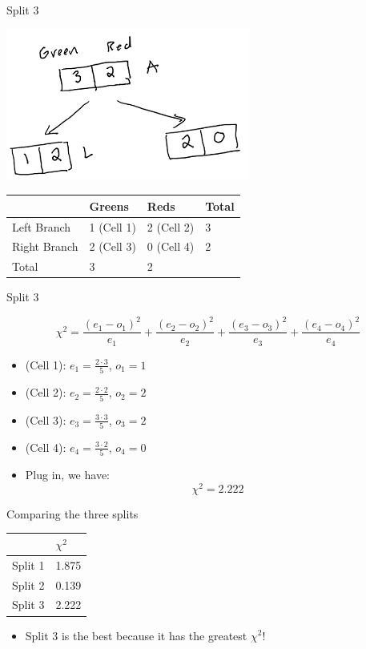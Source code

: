 \documentclass[
  ignorenonframetext,
]{beamer}
\providecommand{\tightlist}{%
  \setlength{\itemsep}{0pt}\setlength{\parskip}{0pt}}
\begin{document}
\begin{frame}{Split 3}
\protect\hypertarget{split-3}{}

\includegraphics{images2/im2.png}

\begin{longtable}[]{@{}llll@{}}
\toprule
& Greens & Reds & Total\tabularnewline
\midrule
\endhead
Left Branch & 1 (Cell 1) & 2 (Cell 2) & 3\tabularnewline
Right Branch & 2 (Cell 3) & 0 (Cell 4) & 2\tabularnewline
Total & 3 & 2 &\tabularnewline
\bottomrule
\end{longtable}

\end{frame}

\begin{frame}{Split 3}
\protect\hypertarget{split-3-1}{}

\[\chi^2 = \frac{(e_1-o_1)^2}{e_1}+\frac{(e_2-o_2)^2}{e_2}+\frac{(e_3-o_3)^2}{e_3}+\frac{(e_4-o_4)^2}{e_4}\]

\begin{itemize}
\item
  (Cell 1): \(e_1 = \frac{2\cdot 3}{5}\), \(o_1 = 1\)
\item
  (Cell 2): \(e_2 = \frac{2\cdot 2}{5}\), \(o_2 = 2\)
\item
  (Cell 3): \(e_3 = \frac{3\cdot 3}{5}\), \(o_3 = 2\)
\item
  (Cell 4): \(e_4 = \frac{3\cdot 2}{5}\), \(o_4 = 0\)
\item
  Plug in, we have: \[\chi^2 = 2.222\]
\end{itemize}

\end{frame}

\begin{frame}{Comparing the three splits}
\protect\hypertarget{comparing-the-three-splits}{}

\begin{longtable}[]{@{}ll@{}}
\toprule
& \(\chi^2\)\tabularnewline
\midrule
\endhead
Split 1 & 1.875\tabularnewline
Split 2 & 0.139\tabularnewline
Split 3 & 2.222\tabularnewline
\bottomrule
\end{longtable}

\begin{itemize}
\tightlist
\item
  Split 3 is the best because it has the greatest \(\chi^2\)!
\end{itemize}

\end{frame}
\end{document}
